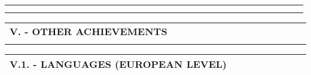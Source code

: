 \documentclass[11pt, letterpaper]{extarticle}
\begin{document}
\begin{longtable}{C{0.154\linewidth}C{0.834\linewidth}N}
		                                                             &                                                                                                                                                                                                                                                  & \\[-0.25cm]
		                                                             &                                                                                                                                                                                                                                                  & \\[-0.25cm]\hline
	\end{longtable}

	\newpage


	\label{tab:V}
	\begin{longtable}{C{1.000\linewidth}C{0.000\linewidth}N} 
		\textbf{\Large V. - OTHER ACHIEVEMENTS} & \\[0.80cm] 
	\end{longtable}


	\label{sec:V.1.}
	\begin{longtable}{C{1.012\linewidth}N}
		\textbf{\large V.1. - LANGUAGES (EUROPEAN LEVEL)} & \\[0.70cm] \hline
	\end{longtable}
\end{document}
